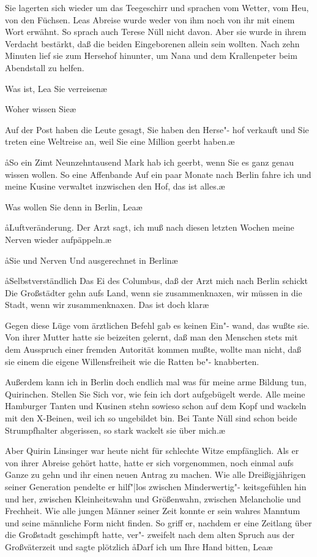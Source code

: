 Sie lagerten sich wieder um das Teegeschirr und sprachen
vom Wetter, vom Heu, von den Füchsen. Leas Abreise wurde
weder von ihm noch von ihr mit einem Wort erwähnt. So
sprach auch Terese Nüll nicht davon. Aber sie wurde in ihrem
Verdacht bestärkt, daß die beiden Eingeborenen allein sein
wollten. Nach zehn Minuten lief sie zum Hersehof hinunter,
um Nana und dem Krallenpeter beim Abendstall zu helfen.

\aanah{}Was ist, Lea\frag{} Sie verreisen\frag{}\ae{}

\aanah{}Woher wissen Sie\frag{}\ae{}

\aanah{}Auf der Post haben die Leute gesagt, Sie haben den Herse"-%
hof verkauft und Sie treten eine Weltreise an, weil Sie eine
Million geerbt haben.\ae{}

\aa{}So ein Zimt\ausr{} Neunzehntausend Mark hab ich geerbt, wenn
Sie es ganz genau wissen wollen. So eine Affenbande\ausr{} Auf
ein paar Monate nach Berlin fahre ich und meine Kusine
verwaltet inzwischen den Hof, das ist alles.\ae{}

\aanah{}Was wollen Sie denn in Berlin, Lea\frag{}\ae{}

\aa{}Luftveränderung. Der Arzt sagt, ich muß nach diesen letzten
Wochen meine Nerven wieder aufpäppeln.\ae{}

\aa{}Sie und Nerven\frag{} Und ausgerechnet in Berlin\frag{}\ae{}

\aa{}Selbstverständlich\ausr{} Das Ei des Columbus, daß der Arzt mich
nach Berlin schickt\ausr{} Die Großstädter gehn aufs Land, wenn
sie zusammenknaxen, wir müssen in die Stadt, wenn wir
zusammenknaxen. Das ist doch klar\ausr{}\ae{}

Gegen diese Lüge vom ärztlichen Befehl gab es keinen Ein"-%
wand, das wußte sie. Von ihrer Mutter hatte sie beizeiten
gelernt, daß man den Menschen stets mit dem Ausspruch
einer fremden Autorität kommen mußte, wollte man nicht,
daß sie einem die eigene Willensfreiheit wie die Ratten be"-%
knabberten.

\aanah{}Außerdem kann ich in Berlin doch endlich mal was für
meine arme Bildung tun, Quirinchen. Stellen Sie Sich%
\eingriff{eS35-1}{Sich ] sich}
vor,
wie fein ich dort aufgebügelt werde. Alle meine Hamburger
Tanten und Kusinen stehn sowieso schon auf dem Kopf und
wackeln mit den X-Beinen, weil ich so ungebildet bin. Bei
Tante Nüll sind schon beide Strumpfhalter abgerissen, so
stark wackelt sie über mich.\ae{}

Aber Quirin Linsinger war heute nicht für schlechte Witze
empfänglich. Als er von ihrer Abreise gehört hatte, hatte er
sich vorgenommen, noch einmal aufs Ganze zu gehn und ihr
einen neuen Antrag zu machen. Wie alle Dreißigjährigen
seiner Generation pendelte er hilf"|los zwischen Minderwertig"-%
keitsgefühlen hin und her, zwischen Kleinheitswahn und
Größenwahn, zwischen Melancholie und Frechheit. Wie alle
jungen Männer seiner Zeit konnte er sein wahres Manntum
und seine männliche Form nicht finden. So griff er, nachdem
er eine Zeitlang über die Großstadt geschimpft hatte, ver"-%
zweifelt nach dem alten Spruch aus der Großväterzeit und
sagte plötzlich\dopp{} \aa{}Darf ich um Ihre Hand bitten, Lea\frag{}\ae{}

